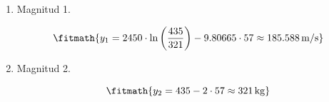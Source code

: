 \begin{enumerate}

\item Magnitud 1.

\[\fitmath{y_{1}=2450\cdot \ln\left(\frac{435}{321}\right)-9.80665\cdot 57\approx 185.588\,\mathrm{m/s}}\]

\item Magnitud 2.

\[\fitmath{y_{2}=435-2\cdot 57\approx 321\,\mathrm{kg}}\]

\end{enumerate}
